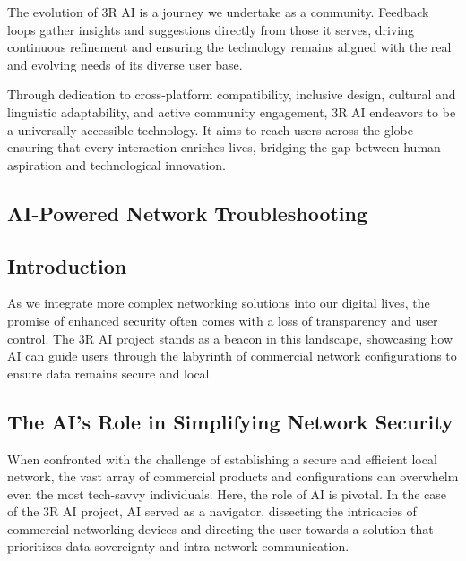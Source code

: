 \documentclass[12pt]{article}
\begin{document}
The evolution of 3R AI is a journey we undertake as a community. Feedback loops gather insights and suggestions directly from those it serves, driving continuous refinement and ensuring the technology remains aligned with the real and evolving needs of its diverse user base.

Through dedication to cross-platform compatibility, inclusive design, cultural and linguistic adaptability, and active community engagement, 3R AI endeavors to be a universally accessible technology. It aims to reach users across the globe ensuring that every interaction enriches lives, bridging the gap between human aspiration and technological innovation.

\subsection{AI-Powered Network Troubleshooting}

\subsection{Introduction}
As we integrate more complex networking solutions into our digital lives, the promise of enhanced security often comes with a loss of transparency and user control. The 3R AI project stands as a beacon in this landscape, showcasing how AI can guide users through the labyrinth of commercial network configurations to ensure data remains secure and local.

\subsection{The AI's Role in Simplifying Network Security}
When confronted with the challenge of establishing a secure and efficient local network, the vast array of commercial products and configurations can overwhelm even the most tech-savvy individuals. Here, the role of AI is pivotal. In the case of the 3R AI project, AI served as a navigator, dissecting the intricacies of commercial networking devices and directing the user towards a solution that prioritizes data sovereignty and intra-network communication.
\end{document}
